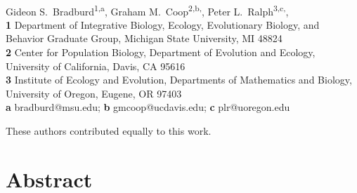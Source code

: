 \documentclass[10pt,letterpaper]{article}
\date{}
\begin{document}
\vspace*{0.2in}

\begin{flushleft}
{\Large
\textbf{}
}
\newline
\\
Gideon S.\  Bradburd\textsuperscript{1,a},
Graham M.\  Coop\textsuperscript{2,b,\Yinyang},
Peter L.\  Ralph\textsuperscript{3,c,\Yinyang},
\\
\bigskip
\textbf{1}
Department of Integrative Biology, 
Ecology, Evolutionary Biology, and Behavior Graduate Group,
Michigan State University, MI 48824
\\
\textbf{2}
Center for Population Biology,
Department of Evolution and Ecology, 
University of California, Davis, CA 95616
\\
\textbf{3} 
Institute of Ecology and Evolution,
Departments of Mathematics and Biology,
University of Oregon, Eugene, OR 97403
\\
\textbf{a} bradburd@msu.edu; 
\textbf{b} gmcoop@ucdavis.edu;
\textbf{c} plr@uoregon.edu

\bigskip

%
\Yinyang These authors contributed equally to this work.

\end{flushleft}
\section*{Abstract}
\end{document}
